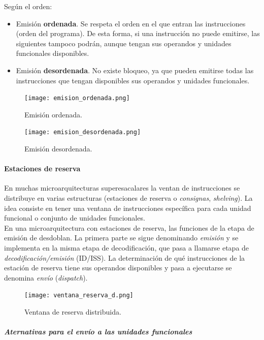 \documentclass[12pt,spanish]{article}
\begin{document}
Según el orden:

\begin{itemize}
	\item Emisión \textbf{ordenada}. Se respeta el orden en el que entran las instrucciones (orden del programa). De esta forma, si una instrucción no puede emitirse, las siguientes tampoco podrán, aunque tengan sus operandos y unidades funcionales disponibles.
	\item Emisión \textbf{desordenada}. No existe bloqueo, ya que pueden emitirse todas las instrucciones que tengan disponibles sus operandos y unidades funcionales.
\end{itemize}

\begin{figure}[H]
\centering
\texttt{[image: emision\_ordenada.png]}
\caption{Emisión ordenada.}
\end{figure}

\begin{figure}[H]
\centering
\texttt{[image: emision\_desordenada.png]}
\caption{Emisión desordenada.}
\end{figure}

\paragraph{Estaciones de reserva\\}

En muchas microarquitecturas superesacalares la ventan de instrucciones se distribuye en varias estructuras (estaciones de reserva o \emph{consignas}, \textit{shelving}). La idea consiste en tener una ventana de instrucciones específica para cada unidad funcional o conjunto de unidades funcionales.\\

En una microarquitectura con estaciones de reserva, las funciones de la etapa de emisión de desdoblan. La primera parte se sigue denominando \emph{emisión} y se implementa en la misma etapa de decodificación, que pasa a llamarse etapa de \emph{decodificación/emisión} (ID/ISS). La determinación de qué instrucciones de la estación de reserva tiene sus operandos disponibles y pasa a ejecutarse se denomina \emph{envío} (\textit{dispatch}).

\begin{figure}[H]
\centering
\texttt{[image: ventana\_reserva\_d.png]}
\caption{Ventana de reserva distribuida.}
\end{figure}

\subparagraph{Aternativas para el envío a las unidades funcionales\\}
\end{document}
